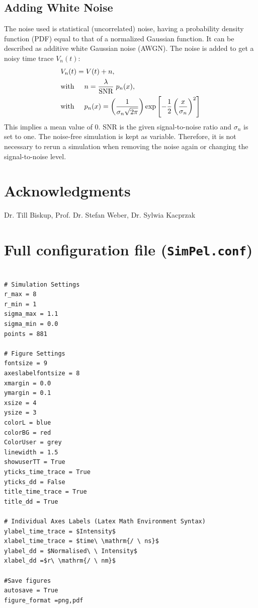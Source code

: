 \documentclass[pdftex,bezier,german,a4,twoside, headexclude,12pt,nochapterprefix, titlepage]{extarticle}
\begin{document}
\subsection{Adding White Noise}
The noise used is statistical (uncorrelated) noise, having a probability density function (PDF) equal to that of a normalized Gaussian function.
It can be described as additive white Gaussian noise (AWGN). The noise is added to get a noisy time trace $V_n(t)$:
\begin{align}
\begin{split}
 & V_n(t) = V(t)+n,\\
 &\mbox{with}\hspace{0.5cm} n = \dfrac{\lambda}{\text{SNR}} \; p_n(x), \\
 &\mbox{with}\hspace{0.5cm} p_n(x) = \left(\dfrac{1}{\sigma_n \sqrt{2\pi}}\right)
 \mathrm{exp}\left[-\frac{1}{2}\left(\frac{x}{\sigma_n}\right)^2\right]
 \end{split}
\end{align}
This implies a mean value of $0$. SNR is the given signal-to-noise ratio and $\sigma_n$ is set to one.
The noise-free simulation is kept as variable. Therefore, it is not necessary to rerun a simulation when removing the noise again or
changing the signal-to-noise level.
\newpage
\section{Acknowledgments}
Dr. Till Biskup,
Prof. Dr. Stefan Weber,
Dr. Sylwia Kacprzak

\newpage
\section{Full configuration file (\texttt{SimPel.conf})}
\begin{lstlisting}[caption={Complete configuration file of the default settings of SimPel},label = full_config_list]

# Simulation Settings
r_max = 8
r_min = 1
sigma_max = 1.1
sigma_min = 0.0
points = 881

# Figure Settings
fontsize = 9
axeslabelfontsize = 8
xmargin = 0.0
ymargin = 0.1
xsize = 4
ysize = 3 
colorL = blue
colorBG = red
ColorUser = grey
linewidth = 1.5
showuserTT = True
yticks_time_trace = True
yticks_dd = False
title_time_trace = True
title_dd = True

# Individual Axes Labels (Latex Math Environment Syntax)
ylabel_time_trace = $Intensity$
xlabel_time_trace = $time\ \mathrm{/ \ ns}$
ylabel_dd = $Normalised\ \ Intensity$
xlabel_dd =$r\ \mathrm{/ \ nm}$

#Save figures
autosave = True
figure_format =png,pdf
\end{lstlisting}
\end{document}
